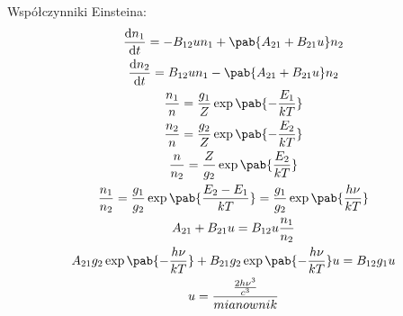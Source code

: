 Współczynniki Einsteina:
\begin{gather*}
	\odv{n_1}{t} = - B_{12} u n_1 + \pab{A_{21} + B_{21} u} n_2 \\
	\odv{n_2}{t} =   B_{12} u n_1 - \pab{A_{21} + B_{21} u} n_2 \\
	\frac{n_1}{n} = \frac{g_1}{Z}\exp\pab{-\frac{E_1}{kT}} \\
	\frac{n_2}{n} = \frac{g_2}{Z}\exp\pab{-\frac{E_2}{kT}} \\
	\frac{n}{n_2} = \frac{Z}{g_2}\exp\pab{\frac{E_2}{kT}} \\
	\frac{n_1}{n_2} = \frac{g_1}{g_2}\exp\pab{\frac{E_2 - E_1}{kT}} = \frac{g_1}{g_2}\exp\pab{\frac{h\nu}{kT}} \\
	A_{21} + B_{21} u = B_{12} u \frac{n_1}{n_2} \\
	A_{21}g_{2} \exp\pab{-\frac{h\nu}{kT}} + B_{21}g_{2} \exp\pab{-\frac{h\nu}{kT}} u = B_{12}g_{1} u \\
	u = \frac{\frac{2h\nu^3}{c^3}}{mianownik}
\end{gather*}